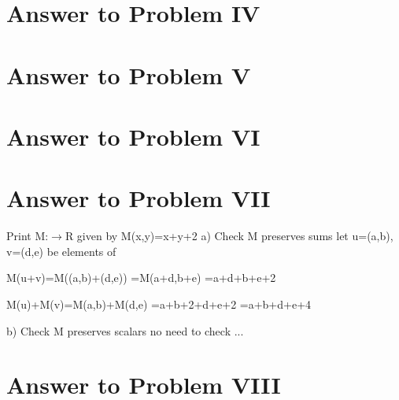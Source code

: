 \documentclass[11pt,a4paper]{article}
\begin{document}
\clearpage

\section{Answer to Problem IV}\label{sec:P04}



\clearpage

\section{Answer to Problem V}\label{sec:P05}



\clearpage

\section{Answer to Problem VI}\label{sec:P06}



\clearpage

\section{Answer to Problem VII}\label{sec:P07}

\begin{mmaCell}{Print}
M:\(\pmb{\rightarrow}\)R given by M(x,y)=x+y+2
a) Check M preserves sums
let u=(a,b), v=(d,e) be elements of 

M(u+v)=M((a,b)+(d,e))
      =M(a+d,b+e)
      =a+d+b+e+2

M(u)+M(v)=M(a,b)+M(d,e)
         =a+b+2+d+e+2
         =a+b+d+e+4


b) Check M preserves scalars
no need to check ...
\end{mmaCell}

\clearpage

\section{Answer to Problem VIII}\label{sec:P08}
\end{document}
